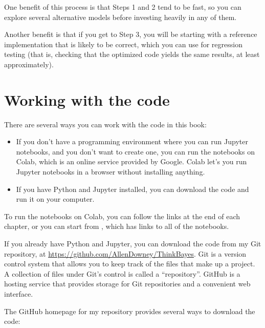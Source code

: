 \documentclass[12pt]{book}
\theoremstyle{exercise}
\begin{document}
One benefit of this process is that Steps 1 and 2 tend to be fast, so you
can explore several alternative models before investing heavily in any
of them.

Another benefit is that if you get to Step 3, you will be starting
with a reference implementation that is likely to be correct,
which you can use for regression testing (that is, checking that the
optimized code yields the same results, at least approximately).


\section{Working with the code}
\label{codeinfo}

There are several ways you can work with the code in this book:

\begin{itemize}

\item If you don't have a programming environment where you can run Jupyter notebooks, and you don't want to create one, you can run the notebooks on Colab, which is an online service provided by Google.  Colab let's you run Jupyter notebooks in a browser without installing anything.

\item If you have Python and Jupyter installed, you can download the code and run it on your computer.

\end{itemize}

To run the notebooks on Colab, you can follow the links at the end of each chapter, or you can start from \url{}, which has links to all of the notebooks.

If you already have Python and Jupyter, you can download the code from
my Git repository, at \url{https://github.com/AllenDowney/ThinkBayes}.  Git is a version control system that allows you to keep track of the files that make up a project.
A collection of files under Git's control is
called a ``repository''.
GitHub is a hosting service that provides storage for Git repositories and a convenient web interface.


The GitHub homepage for my repository provides several ways to download the code:
\end{document}
